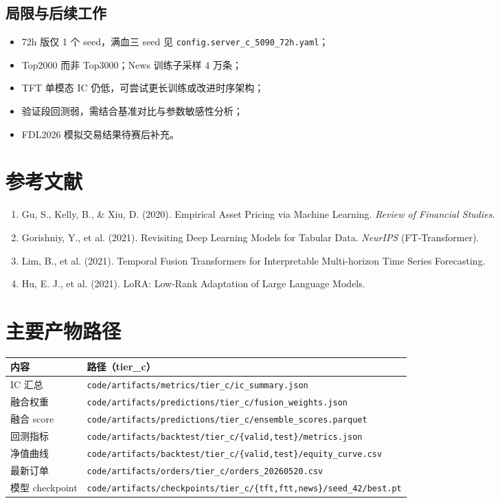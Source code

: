 \documentclass[UTF8,a4paper,12pt]{ctexart}
\begin{document}
\subsection{局限与后续工作}

\begin{itemize}[leftmargin=2em]
  \item 72h 版仅 1 个 seed，满血三 seed 见 \texttt{config.server\_c\_5090\_72h.yaml}；
  \item Top2000 而非 Top3000；News 训练子采样 4 万条；
  \item TFT 单模态 IC 仍低，可尝试更长训练或改进时序架构；
  \item 验证段回测弱，需结合基准对比与参数敏感性分析；
  \item FDL2026 模拟交易结果待赛后补充。
\end{itemize}

\section*{参考文献}
\begin{enumerate}[leftmargin=2em]
  \item Gu, S., Kelly, B., \& Xiu, D. (2020). Empirical Asset Pricing via Machine Learning. \textit{Review of Financial Studies}.
  \item Gorishniy, Y., et al. (2021). Revisiting Deep Learning Models for Tabular Data. \textit{NeurIPS} (FT-Transformer).
  \item Lim, B., et al. (2021). Temporal Fusion Transformers for Interpretable Multi-horizon Time Series Forecasting.
  \item Hu, E. J., et al. (2021). LoRA: Low-Rank Adaptation of Large Language Models.
\end{enumerate}

\section{主要产物路径}

\begin{table}[H]
\centering
\small
\begin{tabular}{ll}
\toprule
\textbf{内容} & \textbf{路径（tier\_c）} \\
\midrule
IC 汇总 & \texttt{code/artifacts/metrics/tier\_c/ic\_summary.json} \\
融合权重 & \texttt{code/artifacts/predictions/tier\_c/fusion\_weights.json} \\
融合 score & \texttt{code/artifacts/predictions/tier\_c/ensemble\_scores.parquet} \\
回测指标 & \texttt{code/artifacts/backtest/tier\_c/\{valid,test\}/metrics.json} \\
净值曲线 & \texttt{code/artifacts/backtest/tier\_c/\{valid,test\}/equity\_curve.csv} \\
最新订单 & \texttt{code/artifacts/orders/tier\_c/orders\_20260520.csv} \\
模型 checkpoint & \texttt{code/artifacts/checkpoints/tier\_c/\{tft,ftt,news\}/seed\_42/best.pt} \\
\bottomrule
\end{tabular}
\end{table}
\end{document}
